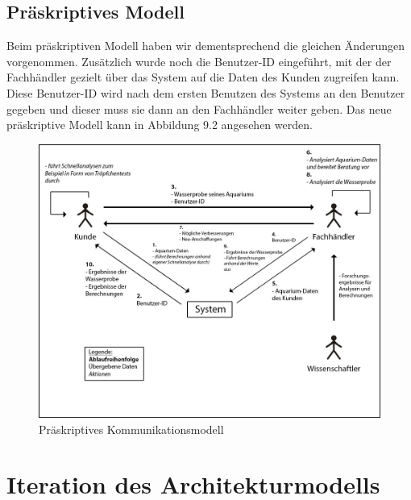 \subsection{Präskriptives Modell}

Beim präskriptiven Modell haben wir dementsprechend die gleichen Änderungen vorgenommen. Zusätzlich wurde noch die Benutzer-ID eingeführt, mit der der Fachhändler gezielt über das System auf die Daten des Kunden zugreifen kann. Diese Benutzer-ID wird nach dem ersten Benutzen des Systems an den Benutzer gegeben und dieser muss sie dann an den Fachhändler weiter geben. Das neue präskriptive Modell kann in Abbildung 9.2 angesehen werden.

\begin{figure}[htbp]
\centering
\includegraphics[width=0.85\linewidth]{Kommunikationsdiagramm2}
\caption{Präskriptives Kommunikationsmodell}
\end{figure}

\section{Iteration des Architekturmodells}

